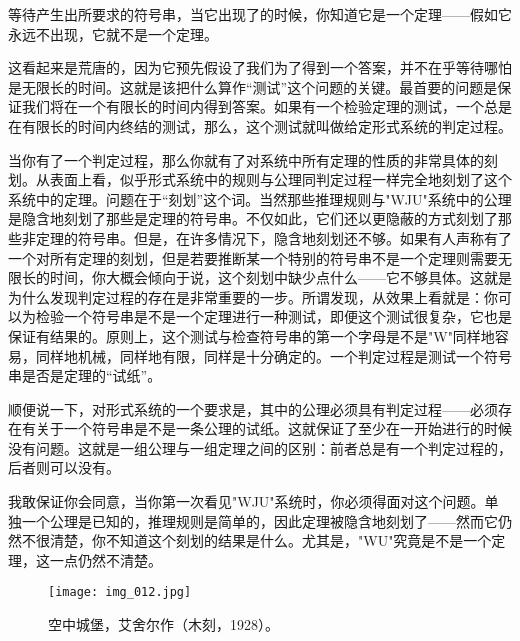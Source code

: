 等待产生出所要求的符号串，当它出现了的时候，你知道它是一个定理——假如它永远不出现，它就不是一个定理。

这看起来是荒唐的，因为它预先假设了我们为了得到一个答案，并不在乎等待哪怕是无限长的时间。这就是该把什么算作“测试”这个问题的关键。最首要的问题是保证我们将在一个有限长的时间内得到答案。如果有一个检验定理的测试，一个总是在有限长的时间内终结的测试，那么，这个测试就叫做给定形式系统的判定过程。

当你有了一个判定过程，那么你就有了对系统中所有定理的性质的非常具体的刻划。从表面上看，似乎形式系统中的规则与公理同判定过程一样完全地刻划了这个系统中的定理。问题在于“刻划”这个词。当然那些推理规则与"WJU"系统中的公理是隐含地刻划了那些是定理的符号串。不仅如此，它们还以更隐蔽的方式刻划了那些非定理的符号串。但是，在许多情况下，隐含地刻划还不够。如果有人声称有了一个对所有定理的刻划，但是若要推断某一个特别的符号串不是一个定理则需要无限长的时间，你大概会倾向于说，这个刻划中缺少点什么——它不够具体。这就是为什么发现判定过程的存在是非常重要的一步。所谓发现，从效果上看就是：你可以为检验一个符号串是不是一个定理进行一种测试，即便这个测试很复杂，它也是保证有结果的。原则上，这个测试与检查符号串的第一个字母是不是"W"同样地容易，同样地机械，同样地有限，同样是十分确定的。一个判定过程是测试一个符号串是否是定理的“试纸”。

顺便说一下，对形式系统的一个要求是，其中的公理必须具有判定过程——必须存在有关于一个符号串是不是一条公理的试纸。这就保证了至少在一开始进行的时候没有问题。这就是一组公理与一组定理之间的区别：前者总是有一个判定过程的，后者则可以没有。

我敢保证你会同意，当你第一次看见"WJU"系统时，你必须得面对这个问题。单独一个公理是已知的，推理规则是简单的，因此定理被隐含地刻划了——然而它仍然不很清楚，你不知道这个刻划的结果是什么。尤其是，"WU"究竟是不是一个定理，这一点仍然不清楚。

\begin{figure}
\texttt{[image: img\_012.jpg]}
\caption[空中城堡，艾舍尔作。]
  {空中城堡，艾舍尔作（木刻，1928）。}
\end{figure}

